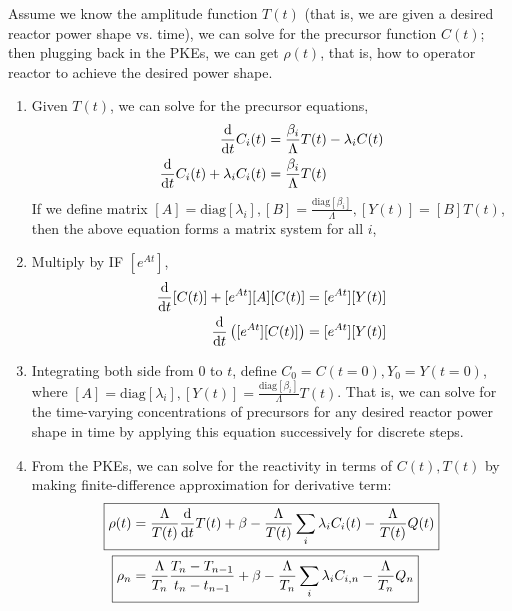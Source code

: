 \documentclass{school-22.211-notes}
\begin{document}
\clearpage
{}
Assume we know the amplitude function $T(t)$ (that is, we are given a desired reactor power shape vs. time), we can solve for the precursor function $C(t)$; then plugging back in the PKEs, we can get $\rho(t)$, that is, how to operator reactor to achieve the desired power shape. 
\begin{enumerate}
\item Given $T(t)$, we can solve for the precursor equations, 
\begin{align}
\frac{\mathrm{d}}{\mathrm{d}t} C_i(t) &= \frac{\beta_i}{\Lambda} T(t) - \lambda_i C(t) \\
\frac{\mathrm{d}}{\mathrm{d}t} C_i (t) + \lambda_i C_i(t) &= \frac{\beta_i}{\Lambda} T(t) 
\end{align}
If we define matrix $[A] = \mathrm{diag}[\lambda_i], [B] = \frac{\mathrm{diag}[\beta_i]}{\Lambda}, [Y(t)] = [B] T(t)$, then the above equation forms a matrix system for all $i$,

\item Multiply by IF $[e^{At}]$, 
\begin{align}
[e^{At}] \ddt[C(t)]  + [e^{At}][A] [C(t)] &= [e^{At}] [Y(t)] \\
\ddt \left( [e^{At}][C(t)]  \right) &=  [e^{At}] [Y(t)]
\end{align}

\item Integrating both side from $0$ to $t$, define $C_0 = C(t=0), Y_0 = Y(t=0)$,  
where $[A] = \mathrm{diag}[\lambda_i], [Y(t)] = \frac{\mathrm{diag}[\beta_i]}{\Lambda} T(t)$.
That is, we can solve for the time-varying concentrations of precursors for any desired reactor power shape in time by applying this equation successively for discrete steps. 

\item From the PKEs, we can solve for the reactivity in terms of $C(t), T(t)$ by making finite-difference approximation for derivative term: 
\begin{align}
\Aboxed{\rho(t) &= \frac{\Lambda}{T(t)} \ddt T(t) + \beta - \frac{\Lambda}{T(t)} \Sum_i \lambda_i C_i(t) - \frac{\Lambda}{T(t)} Q(t) } \\
\Aboxed{ \rho_n &= \frac{\Lambda}{T_n} \frac{T_n - T_{n-1}}{t_n - t_{n-1}} + \beta - \frac{\Lambda}{T_n} \Sum_i \lambda_i C_{i,n} - \frac{\Lambda}{T_n} Q_n } 
\end{align}
\end{enumerate}
\end{document}
